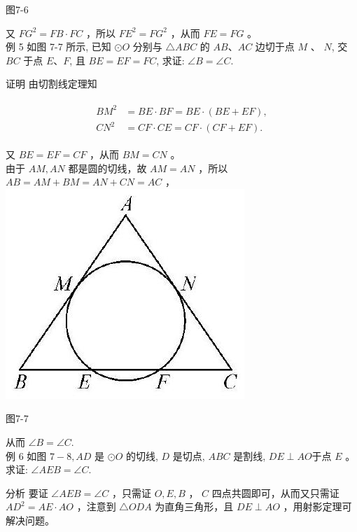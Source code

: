 \documentclass[10pt]{article}
\begin{document}
图7-6

又 $F G^{2}=F B \cdot F C$ ，所以 $F E^{2}=F G^{2}$ ，从而 $F E=F G$ 。\\
例 5 如图 7-7 所示, 已知 $\odot O$ 分别与 $\triangle A B C$ 的 $A B 、 A C$ 边切于点 $M$ 、 $N$, 交 $B C$ 于点 $E 、 F$, 且 $B E=E F=F C$, 求证: $\angle B=\angle C$.

证明 由切割线定理知

\begin{align*}
\begin{aligned}
B M^{2} & =B E \cdot B F=B E \cdot(B E+E F), \\
C N^{2} & =C F \cdot C E=C F \cdot(C F+E F) .
\end{aligned}
\end{align*}

又 $B E=E F=C F$ ，从而 $B M=C N$ 。\\
由于 $A M, A N$ 都是圆的切线，故 $A M=A N$ ，所以 $A B=A M+B M=A N+C N=A C$ ，\\
\includegraphics[max width=\textwidth, center]{2024_10_30_66b8e5e701da2093c133g-054}

图7-7

从而 $\angle B=\angle C$.\\
例 6 如图 $7-8, A D$ 是 $\odot O$ 的切线, $D$ 是切点, $A B C$ 是割线, $D E \perp A O$于点 $E$ 。求证: $\angle A E B=\angle C$.

分析 要证 $\angle A E B=\angle C$ ，只需证 $O, E, B$ ， $C$ 四点共圆即可，从而又只需证 $A D^{2}=A E \cdot A O$ ，注意到 $\triangle O D A$ 为直角三角形，且 $D E \perp A O$ ，用射影定理可解决问题。
\end{document}
